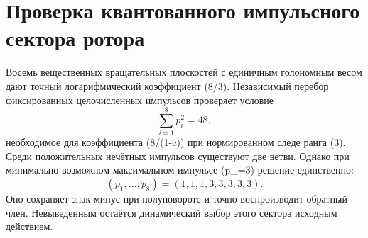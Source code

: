 \section*{Проверка квантованного импульсного сектора ротора}

Восемь вещественных вращательных плоскостей с единичным голономным весом
дают точный логарифмический коэффициент (8/3). Независимый перебор
фиксированных целочисленных импульсов проверяет условие
\[
 \sum_{i=1}^{8}p_i^2=48,
\]
необходимое для коэффициента (8/(1-c)) при нормированном следе ранга (3).
Среди положительных нечётных импульсов существуют две ветви. Однако при
минимально возможном максимальном импульсе (p_{\max}=3) решение единственно:
\[
 (p_1,\ldots,p_8)=(1,1,1,3,3,3,3,3).
\]
Оно сохраняет знак минус при полуповороте и точно воспроизводит обратный
член. Невыведенным остаётся динамический выбор этого сектора исходным
действием.